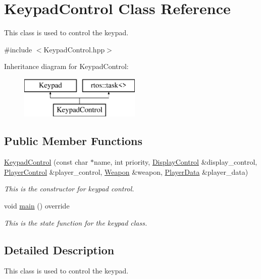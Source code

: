 \hypertarget{class_keypad_control}{}\section{Keypad\+Control Class Reference}
\label{class_keypad_control}


This class is used to control the keypad.  




{\ttfamily \#include $<$Keypad\+Control.\+hpp$>$}

Inheritance diagram for Keypad\+Control\+:\begin{figure}[H]
\begin{center}
\leavevmode
\includegraphics[height=2.000000cm]{class_keypad_control}
\end{center}
\end{figure}
\subsection*{Public Member Functions}
\begin{DoxyCompactItemize}
\item 
\mbox{\hyperlink{class_keypad_control_a4de1bb3018f819011222461d64aa2d67}{Keypad\+Control}} (const char $\ast$name, int priority, \mbox{\hyperlink{class_display_control}{Display\+Control}} \&display\+\_\+control, \mbox{\hyperlink{class_player_control}{Player\+Control}} \&player\+\_\+control, \mbox{\hyperlink{class_weapon}{Weapon}} \&weapon, \mbox{\hyperlink{class_player_data}{Player\+Data}} \&player\+\_\+data)
\begin{DoxyCompactList}\small\item\em This is the constructor for keypad control. \end{DoxyCompactList}\item 
void \mbox{\hyperlink{class_keypad_control_a66ec8a33eceb20d5d1d243c270c3718b}{main}} () override
\begin{DoxyCompactList}\small\item\em This is the state function for the keypad class. \end{DoxyCompactList}\end{DoxyCompactItemize}


\subsection{Detailed Description}
This class is used to control the keypad. 

